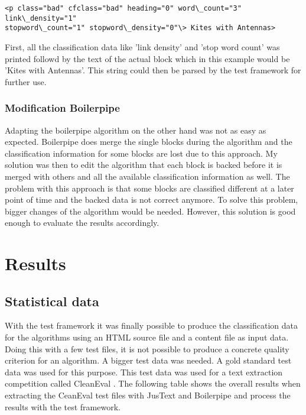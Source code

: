\begin{lstlisting}
<p class="bad" cfclass="bad" heading="0" word\_count="3" link\_density="1" 
stopword\_count="1" stopword\_density="0"\> Kites with Antennas>
\end{lstlisting}

First, all the classification data like 'link density' and 'stop word count' was printed followd by the text of the actual block which in this example would be 'Kites with Antennas'. This string could then be parsed by the test framework for further use.


\subsubsection{Modification Boilerpipe}

Adapting the boilerpipe algorithm on the other hand was not as easy as expected. Boilerpipe does merge the single blocks during the algorithm and the classification information for some blocks are lost due to this approach. My solution was then to edit the algorithm that each block is backed before it is merged with others and all the available classification information as well. The problem with this approach is that some blocks are classified different at a later point of time and the backed data is not correct anymore. To solve this problem, bigger changes of the algorithm would be needed. However, this solution is good enough to evaluate the results accordingly.


\section{Results}


\subsection{Statistical data}

With the test framework it was finally possible to produce the classification data for the  algorithms using an HTML source file and a content file as input data. Doing this with a few test files, it is not possible to produce a concrete quality criterion for an algorithm. A bigger test data was needed. A gold standard test data was used for this purpose. This test data was used for a text extraction competition called CleanEval \cite{CleanEval:online}. 
The following table shows the overall results when extracting the CeanEval test files with JusText and Boilerpipe and process the results with the test framework.


